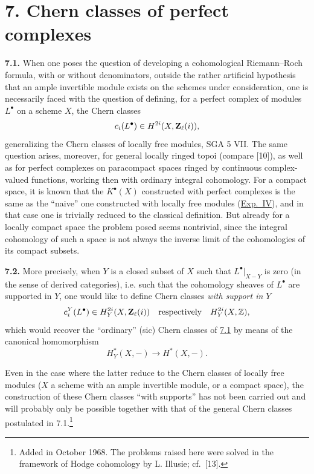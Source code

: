 \section*{7. Chern classes of perfect complexes}

\noindent{}\textbf{7.1.}
When one poses the question of developing a cohomological Riemann--Roch
formula, with or without denominators, outside the rather artificial
hypothesis that an ample invertible module exists on the schemes under
consideration, one is necessarily faced with the question of defining, for
a perfect complex of modules $L^\bullet$ on a scheme $X$, the Chern classes
\[
 c_i(L^\bullet)\in H^{2i}(X,\mathbf Z_\ell(i)),
\]
generalizing the Chern classes of locally free modules, SGA 5 VII. The same
question arises, moreover, for general locally ringed topoi (compare [10]),
as well as for perfect complexes on paracompact spaces ringed by continuous
complex-valued functions, working then with ordinary integral cohomology.
For a compact space, it is known that the $K^\bullet(X)$ constructed with
perfect complexes is the same as the ``naive'' one constructed with locally
free modules (\hyperlink{sga6.e04.expose}{Exp.~IV}), and in that case one is trivially reduced to the
classical definition. But already for a locally compact space the problem
posed seems nontrivial, since the integral cohomology of such a space is not
always the inverse limit of the cohomologies of its compact subsets.

\noindent{}\textbf{7.2.}
More precisely, when $Y$ is a closed subset of $X$ such that
$L^\bullet|_{X-Y}$ is zero (in the sense of derived categories), i.e. such
that the cohomology sheaves of $L^\bullet$ are supported in $Y$, one would
like to define Chern classes \emph{with support in $Y$}
\[
 c_i^Y(L^\bullet)\in H_Y^{2i}(X,\mathbf Z_\ell(i))
 \quad\text{respectively}\quad H_Y^{2i}(X,\mathbb Z),
\]
which would recover the ``ordinary'' (sic) Chern classes of \hyperlink{sga6.e14.para.7-1}{7.1} by means of
the canonical homomorphism
\[
 H_Y^*(X,-)\longrightarrow H^*(X,-).
\]

Even in the case where the latter reduce to the Chern classes of locally
free modules ($X$ a scheme with an ample invertible module, or a compact
space), the construction of these Chern classes ``with supports'' has not
been carried out and will probably only be possible together with that of
the general Chern classes postulated in 7.1.\footnote{Added in October 1968.
The problems raised here were solved in the framework of Hodge cohomology by
L. Illusie; cf.~[13].}

